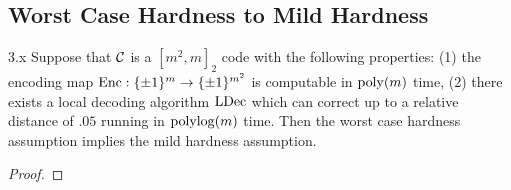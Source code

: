 \documentclass[11pt]{article}
\begin{document}
\subsection{Worst Case Hardness to Mild Hardness}

\begin{theorem}{3.x}
    Suppose that $\mathcal{C}$ is a $[m^2, m]_2$ code with the following properties: (1) the encoding map $\mathrm{Enc} : \{\pm 1\}^m \rightarrow \{\pm 1\}^{m^2}$ is computable in $\mathrm{poly}(m)$ time, (2) there exists a local decoding algorithm ${\textup{LDec}}$ which can correct up to a relative distance of $.05$ running in $\mathrm{polylog}(m)$ time. Then the worst case hardness assumption implies the mild hardness assumption.
\end{theorem}

\begin{proof}


\end{proof}
\end{document}
